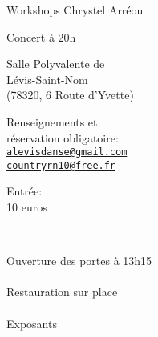 \documentclass[12pt,a4paper]{article}
\begin{document}
\vspace*{-20mm}


\begin{flushleft}
  \fontsize{32pt}{40pt}\selectfont

\fontsize{48pt}{48pt}
\selectfont
\quad Workshops Chrystel Arréou

\quad Concert à 20h %
\end{flushleft}




\vspace*{15mm}

\fontsize{20pt}{20pt}\selectfont

Salle Polyvalente de \\
Lévis-Saint-Nom\\
{\fontsize{14pt}{16pt}\selectfont
(78320, 6 Route d'Yvette)}

\vspace*{5mm}

Renseignements et \\
réservation obligatoire: \\
\href{mailto:alevisdanse@gmail.com?subject=Bal 13 decembre}{\texttt{\color{blue}alevisdanse@gmail.com}} \\
\href{mailto:countryrn10@free.fr?subject=Bal 13 decembre}{\texttt{\color{blue}countryrn10@free.fr}}

\vspace*{5mm}

Entrée: \\
10 euros

\vspace*{-30mm}
\vfill

~\hfill\begin{minipage}{0.35\linewidth}
  \begin{center}
    Ouverture des portes
    à 13h15\\
    ~\\
    Restauration
    sur place\\
    ~\\
    Exposants
\end{center}
\end{minipage}

\end{document}

